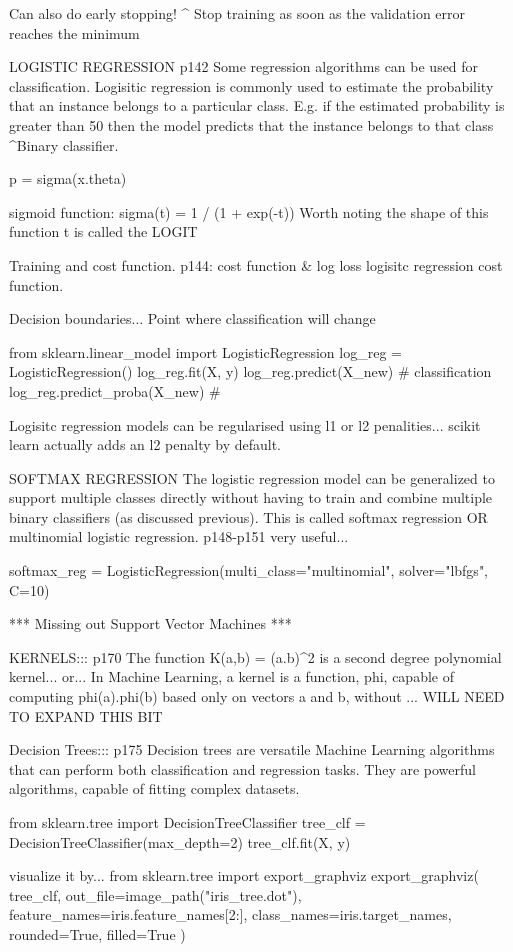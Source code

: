 Can also do early stopping!
^ Stop training as soon as the validation error reaches the minimum

LOGISTIC REGRESSION p142
Some regression algorithms can be used for classification.
Logisitic regression is commonly used to estimate the probability that
an instance belongs to a particular class.
E.g. if the estimated probability is greater than 50%
then the model predicts that the instance belongs to that class
^Binary classifier.

p = sigma(x.theta)

sigmoid function:
sigma(t) = 1 / (1 + exp(-t))
Worth noting the shape of this function
t is called the LOGIT

Training and cost function.
p144: cost function & log loss logisitc regression cost function.

Decision boundaries...
Point where classification will change

from sklearn.linear_model import LogisticRegression
log_reg = LogisticRegression()
log_reg.fit(X, y)
log_reg.predict(X_new) # classification
log_reg.predict_proba(X_new) # 

Logisitc regression models can be regularised using l1 or l2 penalities...
scikit learn actually adds an l2 penalty by default.

SOFTMAX REGRESSION
The logistic regression model can be generalized to support multiple classes directly
without having to train and combine multiple binary classifiers (as discussed previous).
This is called softmax regression OR multinomial logistic regression.
p148-p151 very useful...

softmax_reg = LogisticRegression(multi_class="multinomial", solver="lbfgs", C=10)

*** Missing out Support Vector Machines ***

KERNELS:::
p170
The function K(a,b) = (a.b)^2
is a second degree polynomial kernel...
or...
In Machine Learning,
a kernel is a function, phi,
capable of computing phi(a).phi(b)
based only on vectors a and b,
without ...
WILL NEED TO EXPAND THIS BIT

Decision Trees::: p175
Decision trees are versatile Machine Learning algorithms
that can perform both classification and regression tasks.
They are powerful algorithms, capable of fitting complex datasets.

from sklearn.tree import DecisionTreeClassifier
tree_clf = DecisionTreeClassifier(max_depth=2)
tree_clf.fit(X, y)

visualize it by...
from sklearn.tree import export_graphviz
export_graphviz(
    tree_clf,
    out_file=image_path("iris_tree.dot"),
    feature_names=iris.feature_names[2:],
    class_names=iris.target_names,
    rounded=True,
    filled=True
)

